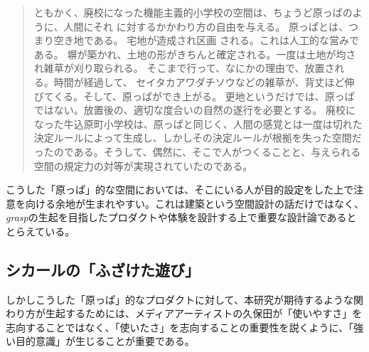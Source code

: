 \begin{quote}
  ともかく、廃校になった機能主義的小学校の空間は、ちょうど原っぱのように、人間にそれ に対するかかわり方の自由を与える。 原っぱとは、つまり空き地である。 宅地が造成され区画 される。これは人工的な営みである。 塀が築かれ、土地の形がきちんと確定される。一度は土地が均され雑草が刈り取られる。 そこまで行って、なにかの理由で、放置される。時間が経過して、 セイタカアワダチソウなどの雑草が、背丈ほど伸びてくる。そして、原っぱができ上がる。 更地というだけでは、原っぱではない。放置後の、適切な度合いの自然の遂行を必要とする。 
  廃校になった牛込原町小学校は、原っぱと同じく、人間の感覚とは一度は切れた決定ルールによって生成し、しかしその決定ルールが根拠を失った空間だったのである。そうして、偶然に、そこで人がつくることと、与えられる空間の規定力の対等が実現されていたのである。  
\end{quote}

こうした「原っぱ」的な空間においては、そこにいる人が目的設定をした上で注意を向ける余地が生まれやすい。これは建築という空間設計の話だけではなく、\textit{grasp}の生起を目指したプロダクトや体験を設計する上で重要な設計論であるととらえている。

\subsection{シカールの「ふざけた遊び」}
しかしこうした「原っぱ」的なプロダクトに対して、本研究が期待するような関わり方が生起するためには、メディアアーティストの久保田が「使いやすさ」を志向することではなく、「使いたさ」を志向することの重要性を説くように、「強い目的意識」が生じることが重要である。

